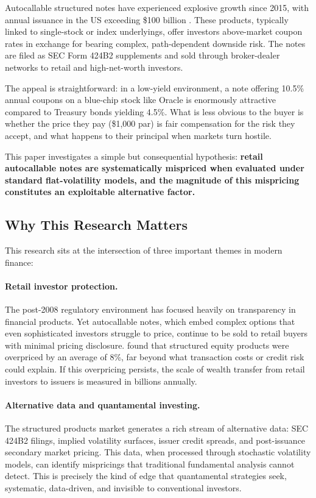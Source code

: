 \documentclass[12pt,a4paper]{article}
\begin{document}
Autocallable structured notes have experienced explosive growth since 2015, with annual issuance in the US exceeding \$100 billion \citep{vokata2021}. These products, typically linked to single-stock or index underlyings, offer investors above-market coupon rates in exchange for bearing complex, path-dependent downside risk. The notes are filed as SEC Form 424B2 supplements and sold through broker-dealer networks to retail and high-net-worth investors.

The appeal is straightforward: in a low-yield environment, a note offering 10.5\% annual coupons on a blue-chip stock like Oracle is enormously attractive compared to Treasury bonds yielding 4.5\%. What is less obvious to the buyer is whether the price they pay (\$1,000 par) is fair compensation for the risk they accept, and what happens to their principal when markets turn hostile.

This paper investigates a simple but consequential hypothesis: \textbf{retail autocallable notes are systematically mispriced when evaluated under standard flat-volatility models, and the magnitude of this mispricing constitutes an exploitable alternative factor.}

\subsection{Why This Research Matters}

This research sits at the intersection of three important themes in modern finance:

\paragraph{Retail investor protection.} The post-2008 regulatory environment has focused heavily on transparency in financial products. Yet autocallable notes, which embed complex options that even sophisticated investors struggle to price, continue to be sold to retail buyers with minimal pricing disclosure. \citet{henderson2011} found that structured equity products were overpriced by an average of 8\%, far beyond what transaction costs or credit risk could explain. If this overpricing persists, the scale of wealth transfer from retail investors to issuers is measured in billions annually.

\paragraph{Alternative data and quantamental investing.} The structured products market generates a rich stream of alternative data: SEC 424B2 filings, implied volatility surfaces, issuer credit spreads, and post-issuance secondary market pricing. This data, when processed through stochastic volatility models, can identify mispricings that traditional fundamental analysis cannot detect. This is precisely the kind of edge that quantamental strategies seek, systematic, data-driven, and invisible to conventional investors.
\end{document}
